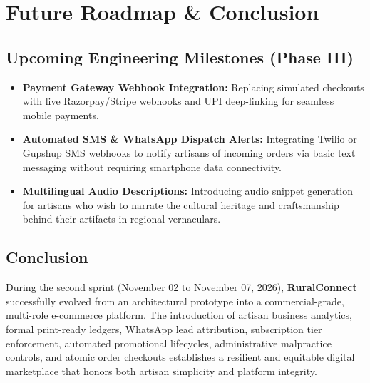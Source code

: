 \documentclass[12pt,a4paper]{article}
\begin{document}
\section{Future Roadmap \& Conclusion}

\subsection{Upcoming Engineering Milestones (Phase III)}
\begin{itemize}
    \item \textbf{Payment Gateway Webhook Integration:} Replacing simulated checkouts with live Razorpay/Stripe webhooks and UPI deep-linking for seamless mobile payments.
    \item \textbf{Automated SMS \& WhatsApp Dispatch Alerts:} Integrating Twilio or Gupshup SMS webhooks to notify artisans of incoming orders via basic text messaging without requiring smartphone data connectivity.
    \item \textbf{Multilingual Audio Descriptions:} Introducing audio snippet generation for artisans who wish to narrate the cultural heritage and craftsmanship behind their artifacts in regional vernaculars.
\end{itemize}

\subsection{Conclusion}
During the second sprint (November 02 to November 07, 2026), \textbf{RuralConnect} successfully evolved from an architectural prototype into a commercial-grade, multi-role e-commerce platform. The introduction of artisan business analytics, formal print-ready ledgers, WhatsApp lead attribution, subscription tier enforcement, automated promotional lifecycles, administrative malpractice controls, and atomic order checkouts establishes a resilient and equitable digital marketplace that honors both artisan simplicity and platform integrity.
\end{document}
